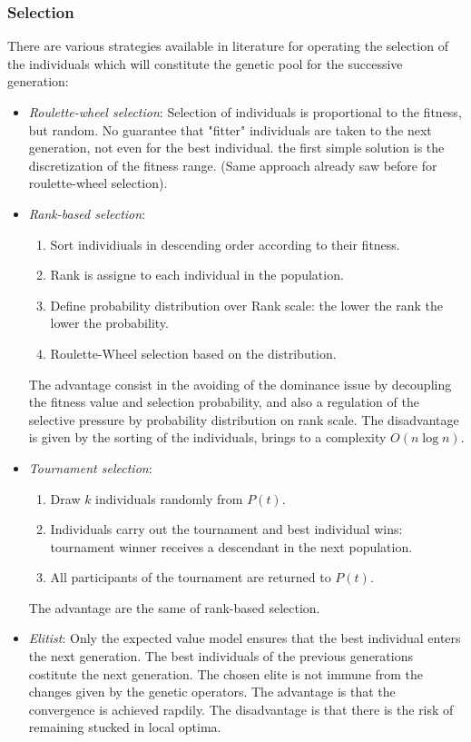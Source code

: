 \documentclass{article}
\begin{document}
\subsubsection{Selection}
There are various strategies available in literature for operating the selection of the individuals
which will constitute the genetic pool for the successive generation:
\begin{itemize}
    \item \textit{Roulette-wheel selection}:
    Selection of individuals is proportional to the fitness, but random.
    No guarantee that "fitter" individuals are taken to the next generation, not even
    for the best individual. the first simple solution is the discretization of the fitness range.
    (Same approach already saw before for roulette-wheel selection).


    \item \textit{Rank-based selection}:
    \begin{enumerate}
        \item Sort individiuals in descending order according to their fitness.
        \item Rank is assigne to each individual in the population.
        \item Define probability distribution over Rank scale: the lower the rank
        the lower the probability.
        \item Roulette-Wheel selection based on the distribution.
    \end{enumerate}
    The advantage consist in the avoiding of the dominance issue by decoupling the fitness
    value and selection probability, and also a regulation of the selective
    pressure by probability distribution on rank scale. The disadvantage is given
    by the sorting of the individuals, brings to a complexity $O(n\log n)$.
    \item \textit{Tournament selection}:
    \begin{enumerate}
        \item Draw $k$ individuals randomly from $P(t)$.
        \item Individuals carry out the tournament and best individual wins:
        tournament winner receives a descendant in the next population.
        \item All participants of the tournament are returned to $P(t)$.
    \end{enumerate}
The advantage are the same of rank-based selection.
    \item \textit{Elitist}: Only the expected value model ensures that the best individual
    enters the next generation. The best individuals of the previous generations
    costitute the next generation. The chosen elite is not immune from the changes
    given by the genetic operators. The advantage is that the convergence is achieved
    rapdily. The disadvantage is that there is the risk of remaining stucked in local optima.



\end{itemize}
\end{document}

